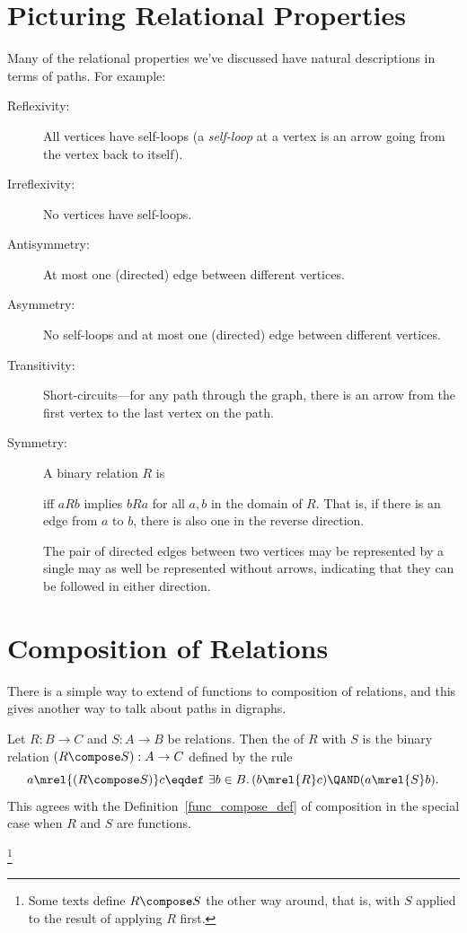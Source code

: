 \section{Picturing Relational Properties}

Many of the relational properties we've discussed have natural
descriptions in terms of paths.  For example:
\begin{description}

\item[Reflexivity:] All vertices have self-loops (a \emph{self-loop} at a
vertex is an arrow going from the vertex back to itself).

\item[Irreflexivity:] No vertices have self-loops.

\item[Antisymmetry:] At most one (directed) edge between different
  vertices.

\item[Asymmetry:] No self-loops and at most one (directed) edge
  between different vertices.

\item[Transitivity:] Short-circuits---for any path through the graph,
there is an arrow from the first vertex to the last vertex on the path.

\item[Symmetry:] A binary relation $R$ is
   iff $aRb$ implies
  $bRa$ for all $a,b$ in the domain of $R$.  That is, if there is an
  edge from $a$ to $b$, there is also one in the reverse direction.
  \begin{staffnotes}
  The pair of directed edges between two vertices may be
  represented by a single  may as well be
  represented without arrows, indicating that they can be followed in
  either direction.
\end{staffnotes}

\end{description}

\section{Composition of Relations}\label{relation_compose_subsec}

There is a simple way to extend  of functions to
composition of relations, and this gives another way to talk about
paths in digraphs.

Let $R: B\to C$ and $S: A \to B$ be relations.  Then the
 of $R$ with $S$ is the binary relation $(R \compose
S): A\to C$ defined by the rule
\[
a \mrel{(R \compose S)} c \eqdef\ \exists b \in B.\, (b \mrel{R} c)
\QAND (a \mrel{S} b).
\]
This agrees with the Definition~\ref{func_compose_def} of composition
in the special case when $R$ and $S$ are functions.
\begin{staffnotes}

\footnote{Some texts define $R \compose S$ the other way around, that
  is, with $S$ applied to the result of applying $R$ first.}

\end{staffnotes}

